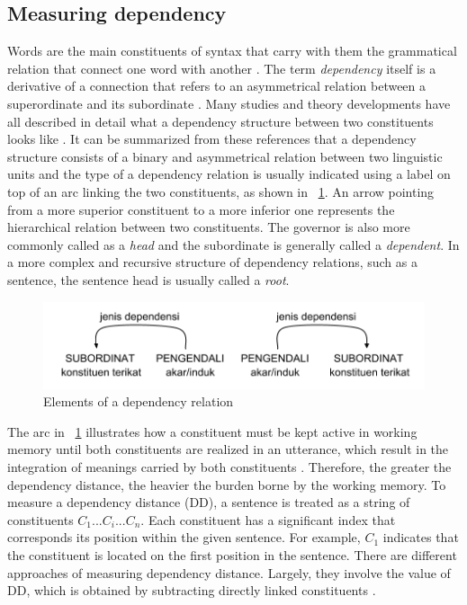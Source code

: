 \documentclass[10pt, a4paper, conference, compsocconf]{IEEEtran}
\begin{document}

\subsection{Measuring dependency}

Words are the main constituents of syntax that carry with them the grammatical relation that connect one word with another \cite{tesniere1959elements}. The term \textit{dependency} itself is a derivative of a connection that refers to an asymmetrical relation between a superordinate and its subordinate \cite{hudson1984word, heringer1993dependency, tesniere1959elements}. Many studies and theory developments have all described in detail what a dependency structure between two constituents looks like \cite{tesniere1959elements, hudson1984word, liu2009chinese}. It can be summarized from these references that a dependency structure consists of a binary and asymmetrical relation between two linguistic units and the type of a dependency relation is usually indicated using a label on top of an arc linking the two constituents, as shown in \pic~\ref{fig:tautandependensi}. An arrow pointing from a more superior constituent to a more inferior one represents the hierarchical relation between two constituents. The governor is also more commonly called as a \textit{head} and the subordinate is generally called a \textit{dependent}. In a more complex and recursive structure of dependency relations, such as a sentence, the sentence head is usually called a \textit{root}.

\begin{figure}
	\centering \includegraphics[width=0.45
	\textwidth] {pics/tautandependensi.png} \caption{Elements of a dependency relation} 
\label{fig:tautandependensi} \end{figure}

The arc in \pic~\ref{fig:tautandependensi} illustrates how a constituent must be kept active in working memory until both constituents are realized in an utterance, which result in the integration of meanings carried by both constituents \cite{hudson2003psychological, liu2008dependency}. Therefore, the greater the dependency distance, the heavier the burden borne by the working memory. To measure a dependency distance (DD), a sentence is treated as a string of constituents $C_{1}...C_{i}...C_{n}$. Each constituent has a significant index that corresponds its position within the given sentence. For example, $C_{1}$ indicates that the constituent is located on the first position in the sentence. There are different approaches of measuring dependency distance. Largely, they involve the value of DD, which is obtained by subtracting directly linked constituents \cite{liu2008dependency, liu2017dependency, futrell2015large}.
\end{document}
